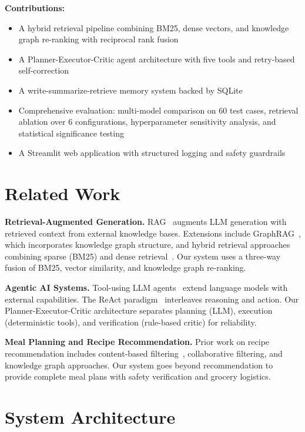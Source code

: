 \documentclass[11pt,twocolumn]{article}
\begin{document}
\noindent\textbf{Contributions:}
\begin{itemize}[nosep]
    \item A hybrid retrieval pipeline combining BM25, dense vectors, and knowledge graph re-ranking with reciprocal rank fusion
    \item A Planner-Executor-Critic agent architecture with five tools and retry-based self-correction
    \item A write-summarize-retrieve memory system backed by SQLite
    \item Comprehensive evaluation: multi-model comparison on 60 test cases, retrieval ablation over 6 configurations, hyperparameter sensitivity analysis, and statistical significance testing
    \item A Streamlit web application with structured logging and safety guardrails
\end{itemize}

\section{Related Work}

\textbf{Retrieval-Augmented Generation.} RAG~\cite{lewis2020rag} augments LLM generation with retrieved context from external knowledge bases. Extensions include GraphRAG~\cite{edge2024graphrag}, which incorporates knowledge graph structure, and hybrid retrieval approaches combining sparse (BM25) and dense retrieval~\cite{chen2024bge}. Our system uses a three-way fusion of BM25, vector similarity, and knowledge graph re-ranking.

\textbf{Agentic AI Systems.} Tool-using LLM agents~\cite{schick2023toolformer} extend language models with external capabilities. The ReAct paradigm~\cite{yao2022react} interleaves reasoning and action. Our Planner-Executor-Critic architecture separates planning (LLM), execution (deterministic tools), and verification (rule-based critic) for reliability.

\textbf{Meal Planning and Recipe Recommendation.} Prior work on recipe recommendation includes content-based filtering~\cite{freyne2010recommending}, collaborative filtering, and knowledge graph approaches. Our system goes beyond recommendation to provide complete meal plans with safety verification and grocery logistics.

\section{System Architecture}
\end{document}

